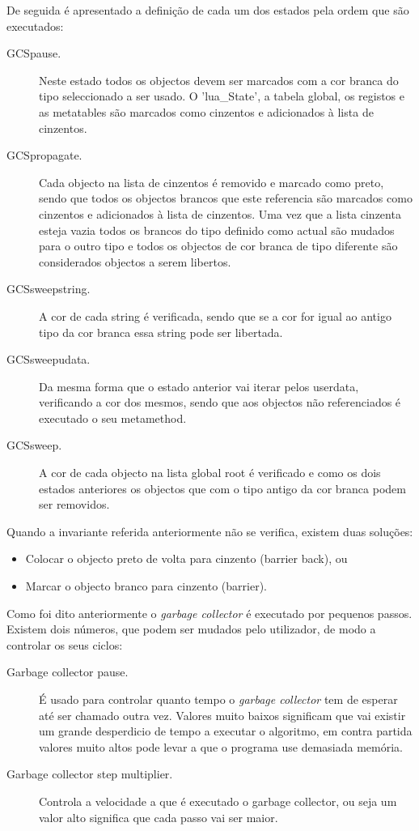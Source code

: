 \documentclass{article}
\begin{document}
De seguida é apresentado a definição de cada um dos estados pela ordem que são executados:
\begin{description}
\item[GCSpause.] Neste estado todos os objectos devem ser marcados com a cor branca do tipo seleccionado a ser usado. O 'lua\_State', a tabela global, os registos e as metatables são marcados como cinzentos e adicionados à lista de cinzentos.
\item[GCSpropagate.] Cada objecto na lista de cinzentos é removido e marcado como preto, sendo que todos os objectos brancos que este referencia são marcados como cinzentos e adicionados à lista de cinzentos. Uma vez que a lista cinzenta esteja vazia todos os brancos do tipo definido como actual são mudados para o outro tipo e todos os objectos de cor branca de tipo diferente são considerados objectos a serem libertos.
\item[GCSsweepstring.] A cor de cada string é verificada, sendo que se a cor for igual ao antigo tipo da cor branca essa string pode ser libertada.
\item[GCSsweepudata.] Da mesma forma que o estado anterior vai iterar pelos userdata, verificando a cor dos mesmos, sendo que aos objectos não referenciados é executado o seu metamethod.
\item[GCSsweep.] A cor de cada objecto na lista global root é verificado e como os dois estados anteriores os objectos que com o tipo antigo da cor branca podem ser removidos.
\end{description}

Quando a invariante referida anteriormente não se verifica, existem duas soluções:
\begin{itemize}
\item Colocar o objecto preto de volta para cinzento (barrier back), ou
\item Marcar o objecto branco para cinzento (barrier).
\end{itemize}

Como foi dito anteriormente o \emph{garbage collector} é executado por pequenos passos. 
Existem dois números, que podem ser mudados pelo utilizador, de modo a controlar os seus ciclos:
\begin{description}
\item[Garbage collector pause.] É usado para controlar quanto tempo o \emph{garbage collector} tem de esperar até ser chamado outra vez. Valores muito baixos significam que vai existir um grande desperdicio de  tempo a executar o algoritmo, em contra partida valores muito altos pode levar a que o programa use demasiada memória.
\item[Garbage collector step multiplier.] Controla a velocidade a que é executado o garbage collector, ou seja um valor alto significa que cada passo vai ser maior.
\end{description}
\end{document}
